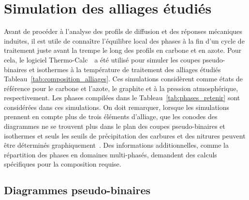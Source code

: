 \section{Simulation des alliages étudiés}
\label{sec:studied_alloys}

Avant de procéder à l'analyse des profils de diffusion et des réponses mécaniques induites, il est utile de connaître l'équilibre local des phases à la fin d'un cycle de traitement \textendash{} juste avant la trempe \textendash{} le long des profils en carbone et en azote. Pour cela, le logiciel Thermo-Calc~\cite{Andersson2002,Borgenstam2000} a été utilisé pour simuler les coupes pseudo-binaires et isothermes à la température de traitement des alliages étudiés \textemdash{} Tableau~\ref{tab:composition_alliages}. Ces simulations considèrent comme états de référence pour le carbone et l'azote, le graphite et  à la pression atmosphérique, respectivement. Les phases compilées dans le Tableau~\ref{tab:phases_retenir} sont considérées dans ces simulations. On doit remarquer, lorsque les simulations prennent en compte plus de trois éléments d'alliage, que les conodes des diagrammes ne se trouvent plus dans le plan des coupes pseudo-binaires et isothermes et seuls les seuils de précipitation des carbures et des nitrures peuvent être déterminés graphiquement~\cite{Hillert2008}. Des informations additionnelles, comme la répartition des phases en domaines multi-phasés, demandent des  calculs spécifiques pour la composition requise.

\subsection{Diagrammes pseudo-binaires}

